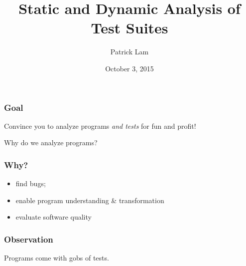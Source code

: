 \documentclass{beamer}
\title{Static and Dynamic Analysis of Test Suites}
\author{Patrick Lam}
\date{October 3, 2015}
\newenvironment{changemargin}[1]{%
  \begin{list}{}{%
    \setlength{\topsep}{0pt}%
    \setlength{\leftmargin}{#1}%
    \setlength{\rightmargin}{1em}
    \setlength{\listparindent}{\parindent}%
    \setlength{\itemindent}{\parindent}%
    \setlength{\parsep}{\parskip}%
  }%
  \item[]}{\end{list}}
\begin{document}
\begin{frame}
  \titlepage
\end{frame}

\begin{frame}
  \frametitle{Goal}
  \Large
  \begin{changemargin}{1cm}
Convince you to analyze programs \emph{and tests} for fun and profit!
  \end{changemargin}
\end{frame}


\begin{frame}
  \centering
  \LARGE
  Why do we analyze programs?
\end{frame}

\begin{frame}
  \frametitle{Why?}
  \Large
  \begin{changemargin}{1cm}
    \begin{itemize}
    \item find bugs;
    \item enable program understanding \& transformation
    \item evaluate software quality
    \end{itemize}
  \end{changemargin}
\end{frame}


\begin{frame}
  \frametitle{Observation}
  \centering
  \LARGE Programs come with gobs of tests.
\end{frame}
\end{document}
